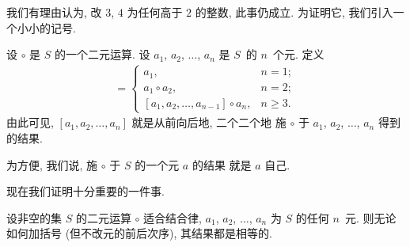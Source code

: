 我们有理由认为,
改 \(3\), \(4\) 为任何高于 \(2\) 的整数,
此事仍成立.
为证明它,
我们引入一个小小的记号.

\begin{definition}
    设 \(\circ\) 是 \(S\) 的一个二元运算.
    设 \(a_1\), \(a_2\), \(\dots\), \(a_n\) 是
    \(S\)~的 \(n\)~个元.
    定义
    \begin{align*}
        [a_1, a_2, \dots, a_n]
        =
        \begin{cases}
            a_1,
             & n = 1;    \\
            a_1 \circ a_2,
             & n = 2;    \\
            [a_1, a_2, \dots, a_{n-1}] \circ a_n,
             & n \geq 3.
        \end{cases}
    \end{align*}
    由此可见, \([a_1, a_2, \dots, a_n]\)
    就是从前向后地, 二个二个地%
    施 \(\circ\) 于
    \(a_1\), \(a_2\), \(\dots\), \(a_n\)
    得到的结果.
\end{definition}

为方便, 我们说,
施 \(\circ\) 于 \(S\) 的一个元 \(a\) 的结果%
就是 \(a\) 自己.

现在我们证明十分重要的一件事.

\begin{theorem}
    设非空的集 \(S\) 的二元运算 \(\circ\) 适合结合律,
    \(a_1\), \(a_2\), \(\dots\), \(a_n\) 为
    \(S\) 的任何 \(n\)~元.
    则无论如何加括号
    (但不改元的前后次序),
    其结果都是相等的.
\end{theorem}


